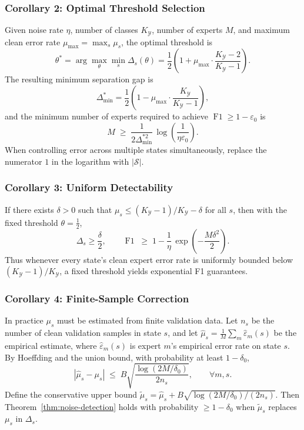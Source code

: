 \subsubsection*{Corollary 2: Optimal Threshold Selection}
Given noise rate $\eta$, number of classes $K_{\mathcal{Y}}$, number of experts
$M$, and maximum clean error rate $\mu_{\max} = \max_s \mu_s$, the optimal
threshold is
\begin{equation}
\theta^* = \arg\max_{\theta} \min_s \Delta_s(\theta)
= \frac12\!\left(1 + \mu_{\max}\cdot\frac{K_{\mathcal{Y}}-2}{K_{\mathcal{Y}}-1}\right).
\label{eq:optimal-threshold}
\end{equation}
The resulting minimum separation gap is
\[
\Delta_{\min}^* = \frac12\!\left(1 - \mu_{\max}\cdot\frac{K_{\mathcal{Y}}}{K_{\mathcal{Y}}-1}\right),
\]
and the minimum number of experts required to achieve
$\operatorname{F1} \geq 1 - \varepsilon_0$ is
\begin{equation}
M \;\geq\; \frac{1}{2\Delta_{\min}^{*2}}\,
\log\!\left(\frac{1}{\eta\varepsilon_0}\right).
\label{eq:min-experts}
\end{equation}
When controlling error across multiple states simultaneously, replace the
numerator $1$ in the logarithm with $|\mathcal{S}|$.

\subsubsection*{Corollary 3: Uniform Detectability}
If there exists $\delta > 0$ such that
$\mu_s \leq (K_{\mathcal{Y}}-1)/K_{\mathcal{Y}} - \delta$ for all $s$, then
with the fixed threshold $\theta = \tfrac12$,
\[
\Delta_s \geq \frac{\delta}{2},\qquad
\operatorname{F1} \;\geq\; 1 - \frac{1}{\eta}\,
\exp\!\left(-\frac{M\delta^2}{2}\right).
\]
Thus whenever every state's clean expert error rate is uniformly bounded
below $(K_{\mathcal{Y}}-1)/K_{\mathcal{Y}}$, a fixed threshold yields
exponential F1 guarantees.

\subsubsection*{Corollary 4: Finite-Sample Correction}
In practice $\mu_s$ must be estimated from finite validation data. Let
$n_s$ be the number of clean validation samples in state $s$, and let
$\hat{\mu}_s = \frac{1}{M}\sum_m \hat{\varepsilon}_m(s)$ be the empirical
estimate, where $\hat{\varepsilon}_m(s)$ is expert $m$'s empirical error
rate on state $s$. By Hoeffding and the union bound, with probability at
least $1 - \delta_0$,
\[
|\hat{\mu}_s - \mu_s| \;\leq\; B\sqrt{\frac{\log(2M/\delta_0)}{2n_s}},
\qquad \forall m, s.
\]
Define the conservative upper bound
$\tilde{\mu}_s = \hat{\mu}_s + B\sqrt{\log(2M/\delta_0)/(2n_s)}$.
Then Theorem~\ref{thm:noise-detection} holds with probability
$\geq 1 - \delta_0$ when $\tilde{\mu}_s$ replaces $\mu_s$ in
$\Delta_s$.

